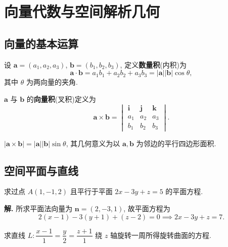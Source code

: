 \documentclass[a4paper,12pt,oneside]{maki-notes}
\begin{document}
	\chapter{向量代数与空间解析几何}
	
	\section{向量的基本运算}
	
	\begin{definition}[向量的数量积]
		设 $\boldsymbol{a} = (a_1, a_2, a_3)$, $\boldsymbol{b} = (b_1, b_2, b_3)$, 定义\textbf{数量积}(内积)为
		\[
		\boldsymbol{a} \cdot \boldsymbol{b} = a_1 b_1 + a_2 b_2 + a_3 b_3 = |\boldsymbol{a}||\boldsymbol{b}|\cos\theta,
		\]
		其中 $\theta$ 为两向量的夹角.
	\end{definition}
	
	\begin{definition}[向量的向量积]
		$\boldsymbol{a}$ 与 $\boldsymbol{b}$ 的\textbf{向量积}(叉积)定义为
		\[
		\boldsymbol{a} \times \boldsymbol{b} = 
		\begin{vmatrix}
			\boldsymbol{i} & \boldsymbol{j} & \boldsymbol{k} \\
			a_1 & a_2 & a_3 \\
			b_1 & b_2 & b_3
		\end{vmatrix}.
		\]
	\end{definition}
	
	\begin{property}
		$|\boldsymbol{a} \times \boldsymbol{b}| = |\boldsymbol{a}||\boldsymbol{b}|\sin\theta$, 其几何意义为以 $\boldsymbol{a}, \boldsymbol{b}$ 为邻边的平行四边形面积.
	\end{property}
	
	\section{空间平面与直线}
	
	\begin{example}
		求过点 $A(1, -1, 2)$ 且平行于平面 $2x - 3y + z = 5$ 的平面方程.
	\end{example}
	
	\textbf{解.} 所求平面法向量为 $\boldsymbol{n} = (2, -3, 1)$, 故平面方程为
	\[
	2(x - 1) - 3(y + 1) + (z - 2) = 0 \implies 2x - 3y + z = 7.
	\]
	
	\begin{realexam}[2015 数学一]
		求直线 $L: \dfrac{x - 1}{1} = \dfrac{y}{2} = \dfrac{z + 1}{1}$ 绕 $z$ 轴旋转一周所得旋转曲面的方程.
	\end{realexam}
	
\end{document}

